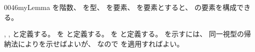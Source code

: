 \documentclass[index]{subfiles}
\begin{document}
\begin{myBlock}{0046}{myLemma}
  を階数、
  を型、
  を要素、
  を要素とすると、
  の要素を構成できる。
\end{myBlock}
\begin{myProof}
  ,
  ,
  と定義する。
  を
  と定義する。
  を
  と定義する。
  を示すには、
  同一視型の帰納法によりを示せばよいが、
  なので
  を適用すればよい。
\end{myProof}
\end{document}
